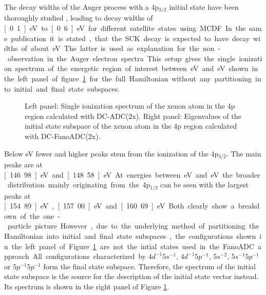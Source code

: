 The decay widths of the Auger process with a 4p$_{3/2}$ initial state have
been thoroughly studied \cite{Heinaesmaeki04}, leading
to decay widths of \unit[0.1]{eV} to
\unit[0.6]{eV} for different satellite states using \ac{MCDF}. In the same publication
it is stated, that the \ac{SCK} decay is expected to have decay widths of
about \unit[10--100]{eV}. The latter is used as explanation for the non-observation
in the Auger electron spectra.


This setup gives the single ionization spectrum of the energetic region of
interest between \unit[140]{eV} and \unit[170]{eV} shown in the left panel of
figure
\ref{figure:Xe4p_SIPs} for the full Hamiltonian without any partitioning
into initial and final state subspaces.

\begin{figure}[]
  \centering
  
  
  \caption{Left panel: Single ionization spectrum of the xenon atom in the 4p region
           calculated with DC-ADC(2x).
           Right panel: Eigenvalues of the initial state subspace of the
           xenon atom in the 4p region                                      
           calculated with DC-FanoADC(2x).}
  \label{figure:Xe4p_SIPs}
\end{figure}

Below \unit[150]{eV} fewer and higher peaks stem from the ionization of the
4p$_{3/2}$. The main peaks are at \unit[146.98]{eV} and \unit[148.58]{eV}.
At energies between \unit[150]{eV} and \unit[165]{eV} the broader
distribution mainly originating from the 4p$_{1/2}$ can be seen with the largest
peaks at \unit[154.89]{eV}, \unit[157.00]{eV} and \unit[160.69]{eV}. Both clearly
show a breakdown of the one-particle picture.

However, due to the underlying method of partitioning the Hamiltonian into
initial and final state subspaces, the configurations shown in the left panel of Figure
\ref{figure:Xe4p_SIPs} are not the intial states used in the FanoADC approach.
All configurations characterized by $4d^{-1}5s^{-1}$, $4d^{-1}5p^{-1}$,
$5s^{-2}$, $5s^{-1}5p^{-1}$ or $5p^{-1}5p^{-1}$ form the final state subspace.
Therefore, the spectrum of the initial state subspace is the source for
the description of the initial state vector instead. Its spectrum is shown in
the right panel of Figure \ref{figure:Xe4p_SIPs}.

